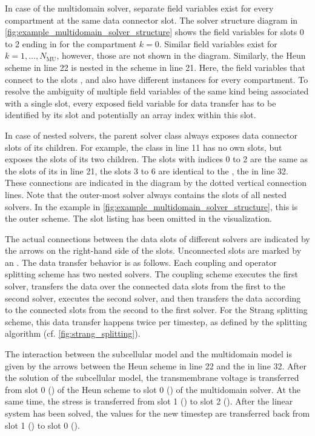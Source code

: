 In case of the multidomain solver, separate field variables exist for every compartment at the same data connector slot. The solver structure diagram in \cref{fig:example_multidomain_solver_structure} shows the field variables for slots 0 to 2 ending in  for the compartment $k=0$. Similar field variables exist for $k=1,\dots,N_\text{MU}$, however, those are not shown in the diagram. Similarly, the Heun scheme in line 22 is nested in the  scheme in line 21. Here, the field variables that connect to the slots ,  and  also have different instances for every compartment. To resolve the ambiguity of multiple field variables of the same kind being associated with a single slot, every exposed field variable for data transfer has to be identified by its slot and potentially an array index within this slot.

In case of nested solvers, the parent solver class always exposes data connector slots of its children. For example, the  class in line 11 has no own slots, but exposes the slots of its two children. The slots with indices 0 to 2 are the same as the slots of its  in line 21, the slots 3 to 6 are identical to the , the  in line 32. These connections are indicated in the diagram by the dotted vertical connection lines.
Note that the outer-most solver always contains the slots of all nested solvers. In the example in \cref{fig:example_multidomain_solver_structure}, this is the outer  scheme. The slot listing has been omitted in the visualization.

The actual connections between the data slots of different solvers are indicated by the arrows on the right-hand side of the slots. Unconnected slots are marked by an .
The data transfer behavior is as follows. Each coupling and operator splitting scheme has two nested solvers. The coupling scheme executes the first solver, transfers the data over the connected data slots from the first to the second solver, executes the second solver, and then transfers the data according to the connected slots from the second to the first solver. For the Strang splitting scheme, this data transfer happens twice per timestep, as defined by the splitting algorithm (cf. \cref{fig:strang_splitting}).

The interaction between the subcellular model and the multidomain model is given by the arrows between the Heun scheme in line 22 and the  in line 32. After the solution of the subcellular model, the transmembrane voltage is transferred from slot 0 () of the Heun scheme to slot 0 () of the multidomain solver. At the same time, the stress is transferred from slot 1 () to slot 2 (). After the linear system has been solved, the values for the new timestep are transferred back from slot 1 () to slot 0 ().

